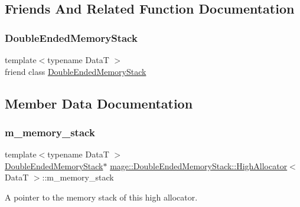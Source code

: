 \subsection{Friends And Related Function Documentation}
\hypertarget{structmage_1_1_double_ended_memory_stack_1_1_high_allocator_a10ae729d55b8c0017057250445835680}{}\label{structmage_1_1_double_ended_memory_stack_1_1_high_allocator_a10ae729d55b8c0017057250445835680} 
\subsubsection{\texorpdfstring{Double\+Ended\+Memory\+Stack}{DoubleEndedMemoryStack}}
{\footnotesize\ttfamily template$<$typename DataT $>$ \\
friend class \hyperlink{classmage_1_1_double_ended_memory_stack}{Double\+Ended\+Memory\+Stack}\hspace{0.3cm}{\ttfamily [friend]}}



\subsection{Member Data Documentation}
\hypertarget{structmage_1_1_double_ended_memory_stack_1_1_high_allocator_a068864bc36afb8d749c71c6814a1b5c9}{}\label{structmage_1_1_double_ended_memory_stack_1_1_high_allocator_a068864bc36afb8d749c71c6814a1b5c9} 
\subsubsection{\texorpdfstring{m\+\_\+memory\+\_\+stack}{m\_memory\_stack}}
{\footnotesize\ttfamily template$<$typename DataT $>$ \\
\hyperlink{classmage_1_1_double_ended_memory_stack}{Double\+Ended\+Memory\+Stack}$\ast$ \hyperlink{structmage_1_1_double_ended_memory_stack_1_1_high_allocator}{mage\+::\+Double\+Ended\+Memory\+Stack\+::\+High\+Allocator}$<$ DataT $>$\+::m\+\_\+memory\+\_\+stack\hspace{0.3cm}{\ttfamily [private]}}

A pointer to the memory stack of this high allocator. 